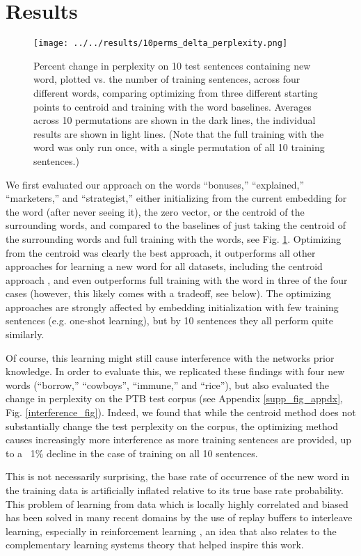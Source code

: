 \documentclass{article}
\begin{document}
\section{Results}
\begin{figure}
\centering
\texttt{[image: ../../results/10perms\_delta\_perplexity.png]}
\caption{Percent change in perplexity on 10 test sentences containing new word, plotted vs. the number of training sentences, across four different words, comparing optimizing from three different starting points to centroid and training with the word baselines. Averages across 10 permutations are shown in the dark lines, the individual results are shown in light lines. (Note that the full training with the word was only run once, with a single permutation of all 10 training sentences.)}
\label{main_results_1}
\end{figure}
We first evaluated our approach on the words ``bonuses,'' ``explained,'' ``marketers,'' and ``strategist,'' either initializing from the current embedding for the word (after never seeing it), the zero vector, or the centroid of the surrounding words, and compared to the baselines of just taking the centroid of the surrounding words and full training with the words, see Fig. \ref{main_results_1}. Optimizing from the centroid was clearly the best approach, it outperforms all other approaches for learning a new word for all datasets, including the centroid approach \citet{Lazaridou2017}, and even outperforms full training with the word in three of the four cases (however, this likely comes with a tradeoff, see below). The optimizing approaches are strongly affected by embedding initialization with few training sentences (e.g. one-shot learning), but by 10 sentences they all perform quite similarly. \par
Of course, this learning might still cause interference with the networks prior knowledge. In order to evaluate this, we replicated these findings with four new words (``borrow,'' ``cowboys'', ``immune,'' and ``rice''), but also evaluated the change in perplexity on the PTB test corpus (see Appendix \ref{supp_fig_appdx}, Fig. \ref{interference_fig}). Indeed, we found that while the centroid method does not substantially change the test perplexity on the corpus, the optimizing method causes increasingly more interference as more training sentences are provided, up to a ~1\% decline in the case of training on all 10 sentences. \par
This is not necessarily surprising, the base rate of occurrence of the new word in the training data is artificially inflated relative to its true base rate probability. This problem of learning from data which is locally highly correlated and biased has been solved in many recent domains by the use of replay buffers to interleave learning, especially in reinforcement learning \citep[e.g]{Mnih2015}, an idea that also relates to the complementary learning systems theory \citep{Kumaran2016} that helped inspire this work. \par
\end{document}

